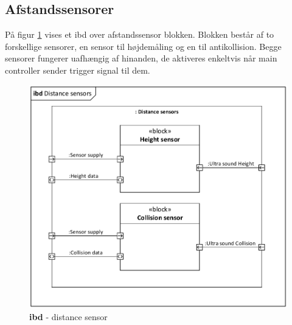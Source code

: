 \subsection{Afstandssensorer}

På figur \ref{fig:ibd_distancesensor} vises et ibd over afstandssensor blokken. 
Blokken består af to forskellige sensorer, en sensor til højdemåling og en til antikollision. Begge sensorer fungerer uafhængig af hinanden, de aktiveres enkeltvis når main controller sender trigger signal til dem.   

\begin{figure}[H]
\centering
\includegraphics[width=1\textwidth]{Billeder/IBD/ibd4_distancesensor.pdf}
\vspace{-0.5cm}
\caption{\textbf{ibd} - distance sensor}
\label{fig:ibd_distancesensor}
\end{figure}

